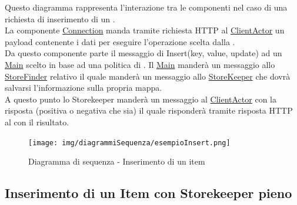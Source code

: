 \documentclass{scalatekids-article}
\begin{document}
Questo diagramma rappresenta l'interazione tra le componenti nel caso di una richiesta di inserimento di un .\\
La componente \hyperref[sec:actorbase::driver::client::Connection]{Connection}
manda tramite richiesta HTTP al \hyperref[sec:actorbase::actorsystem::actors::clientactor::ClientActor]{ClientActor}
un payload contenente i dati per eseguire l'operazione scelta dalla .\\
Da questo componente parte il messaggio di Insert(key, value, update) ad un \hyperref[sec:actorbase::actorsystem::actors::main::Main]{Main} scelto in base ad una
politica di . Il \hyperref[sec:actorbase::actorsystem::actors::main::Main]{Main} manderà un messaggio allo \hyperref[sec:actorbase::actorsystem::actors::storefinder::StoreFinder]{StoreFinder} relativo il quale manderà un messaggio allo \hyperref[sec:actorbase::actorsystem::actors::storekeeper::StoreKeeper]{StoreKeeper} che dovrà salvarsi l'informazione
sulla propria mappa.\\
A questo punto lo Storekeeper manderà un messaggio al \hyperref[sec:actorbase::actorsystem::actors::clientactor::ClientActor]{ClientActor} con la risposta
(positiva o negativa che sia) il quale risponderà tramite risposta HTTP al  con il risultato.
\begin{figure}[H]
  \begin{center}
    \texttt{[image: img/diagrammiSequenza/esempioInsert.png]}
    \caption{Diagramma di sequenza - Inserimento di un item}
  \end{center}
\end{figure}

\subsection{Inserimento di un Item con Storekeeper pieno}
\end{document}
